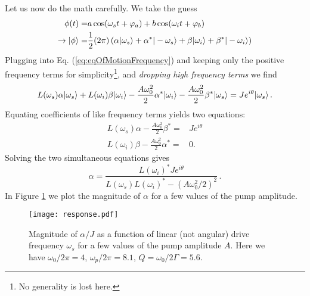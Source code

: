 Let us now do the math carefully.
We take the guess
\begin{align*}
  \phi(t) =& a \cos(\omega_s t + \varphi_a) + b \cos(\omega_i t + \varphi_b) \\
  \rightarrow
  | \phi \rangle =& \frac{1}{2}(2\pi)
  \left(
      \alpha | \omega_s \rangle + \alpha^* | -\omega_s \rangle
    + \beta  | \omega_i \rangle + \beta^*  | -\omega_i \rangle
    \right)
\end{align*}
Plugging into Eq. (\ref{eq:eqOfMotionFrequency}) and keeping only the positive frequency terms for simplicity\footnote{No generality is lost here.}, and \emph{dropping high frequency terms} we find
\begin{equation*}
    L(\omega_s) \alpha | \omega_s \rangle
  + L(\omega_i) \beta  | \omega_i \rangle
  - \frac{A \omega_0^2}{2} \alpha^* | \omega_i \rangle
  - \frac{A \omega_0^2}{2} \beta^*  | \omega_s \rangle
  = J e^{i \theta} | \omega_s \rangle \, .
\end{equation*}
Equating coefficients of like frequency terms yields two equations:
\begin{align*}
  L(\omega_s)\alpha - \frac{A \omega_0^2}{2} \beta^* =& J e^{i \theta} \\
  L(\omega_i)\beta - \frac{A \omega_0^2}{2} \alpha^* =& 0 .
\end{align*}
Solving the two simultaneous equations gives
\begin{equation}
  \alpha = \frac{L(\omega_i)^* J e^{i\theta}}{L(\omega_s)L(\omega_i)^* - (A \omega_0^2/2)^2}
  \, . \label{eq:alphabeta}
\end{equation}
In Figure \ref{Fig:response} we plot the magnitude of $\alpha$ for a few values of the pump amplitude.

\begin{figure}
\begin{centering}
\texttt{[image: response.pdf]}
\par\end{centering}
\caption{Magnitude of $\alpha/J$ as a function of linear (not angular) drive frequency $\omega_s$ for a few values of the pump amplitude $A$.
Here we have $\omega_0/2\pi = 4$, $\omega_p/2\pi = 8.1$, $Q = \omega_0/2\Gamma = 5.6$.
}
\label{Fig:response}
\end{figure}

